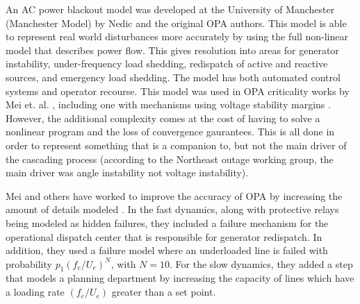 An AC power blackout model was developed at the University of Manchester (Manchester Model) by Nedic \cite{nedic_2006} and the original OPA authors.  This model is able to represent real world disturbances more accurately by using the full non-linear model that describes power flow.  This gives resolution into areas for generator instability, under-frequency load shedding, redispatch of active and reactive sources, and emergency load shedding.  The model has both automated control systems and operator recourse.  This model was used in OPA criticality works by Mei et. al. \cite{mei_2006}, including one with mechanisms using voltage stability margins \cite{mei_2008}.  However, the additional complexity comes at the cost of having to solve a nonlinear program and the loss of convergence gaurantees.  This is all done in order to represent something that is a companion to, but not the main driver of the cascading process (according to the Northeast outage working group, the main driver was angle instability not voltage instability).

Mei and others have worked to improve the accuracy of OPA by increasing the amount of details modeled \cite{mei_2009}.  In the fast dynamics, along with protective relays being modeled as hidden failures, they included a failure mechanism for the operational dispatch center that is responsible for generator redispatch.  In addition, they used a failure model where an underloaded line is failed with probability $p_1 \left( f_e/U_e \right)^N$, with $N=10$.  For the slow dynamics, they added a step that models a planning department by increasing the capacity of lines which have a loading rate $\left( f_{e}/ U_{e}  \right)$ greater than a set point.  

